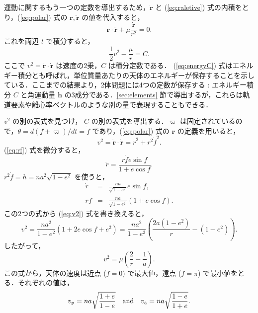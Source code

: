 \documentclass[11pt,a4paper,oneside,onecolumn]{jreport}
\begin{document}
運動に関するもう一つの定数を導出するため，$\dot{{\bm r}}$ と (\ref{eq:raletive}) 式の内積をとり，(\ref{eq:polar}) 式の ${\bm r}, \ddot{{\bm r}}$ の値を代入すると，
\begin{equation}
{\bm r} \cdot \ddot{{\bm r}} + \mu \frac{\dot{{\bm r}}}{r^2} = 0.
\end{equation}
これを両辺 $t$ で積分すると，
\begin{equation}
\frac{1}{2} v^2 - \frac{\mu}{r} = C. \label{eq:energyC}
\end{equation}
ここで $v^2 = \dot{{\bm r}} \cdot \dot{{\bm r}}$ は速度の2乗，$C$ は積分定数である．
(\ref{eq:energyC}) 式はエネルギー積分とも呼ばれ，単位質量あたりの天体のエネルギーが保存することを示している．ここまでの結果より，2体問題には4つの定数が保存する : エネルギー積分 $C$ と角運動量 ${\bm h}$ の3成分である．\ref{sec:elements} 節で導出するが，これらは軌道要素や離心率ベクトルのような別の量で表現することもできる．

$v^2$ の別の表式を見つけ， $C$ の別の表式を導出する．$\varpi$ は固定されているので，$\dot{\theta} = d (f + \varpi) / dt = \dot{f}$ であり，(\ref{eq:polar}) 式の ${\bm r}$ の定義を用いると，
\begin{equation}
v^2 = \dot{{\bm r}} \cdot \dot{{\bm r}} = \dot{r}^2 + r^2 \dot{f}^2. \label{eq:v2}
\end{equation}
(\ref{eq:rf}) 式を微分すると，
\begin{equation}
\dot{r} = \frac{r \dot{f} e \sin f}{1+ e \cos f}.
\end{equation}
$r^2 \dot{f} = h = n a^2 \sqrt{1 - e^2}$ を使うと，
\begin{eqnarray}
\dot{r} & = & \frac{n a}{\sqrt{1 - e^2}} e \sin f, \label{eq:rdot} \\
r \dot{f} & = & \frac{n a}{\sqrt{1 - e^2}} (1+ e \cos f). \label{eq:rfdot}
\end{eqnarray}
この2つの式から (\ref{eq:v2}) 式を書き換えると，
\begin{equation}
v^2 = \frac{n a^2}{1 - e^2} (1 + 2 e \cos f + e^2) = \frac{n a^2}{1 - e^2} \left( \frac{2 a (1 - e^2)}{r} - (1 - e^2) \right).
\end{equation}
したがって，
\begin{equation}
v^2 = \mu \left( \frac{2}{r} - \frac{1}{a} \right). \label{eq:v2new}
\end{equation}
この式から，天体の速度は近点 ($f = 0$) で最大値，遠点 ($f = \pi$) で最小値をとる．それぞれの値は，
\begin{equation}
v_{\rm p} = n a \sqrt{\frac{1 + e}{1 - e}} \quad {\rm and} \quad v_{\rm a} = n a \sqrt{\frac{1 - e}{1 + e}}.
\end{equation}
\end{document}
